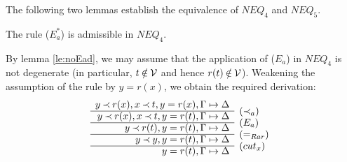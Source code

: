 The following two lemmas establish the equivalence of
  $NEQ_4$ and $NEQ_5$.

\begin{LEMMA}\label{le:Ea*}
The rule ($E_a^*$) is admissible in $NEQ_4$.
\end{LEMMA}
\begin{PROOF}
By lemma \ref{le:noEad}, we may assume that the application of ($E_a$) in
$NEQ_4$ is not degenerate (in particular, $t\not\in\Vars$ and hence $r(t)\not\in\Vars$).
Weakening the assumption of the rule by $y=r(x)$, we obtain the required
derivation:
\[ \begin{array}{rl}
 y\Incl r(x), x\Incl t, y=r(x), \GSD \\ \cline{1-1}
 y\Incl r(x), x\Incl t, y=r(t), \GSD & \rabove{(\Incl_a)} \\ \cline{1-1}
 y\Incl r(t), y=r(t), \GSD & \rabove{(E_a)} \\ \cline{1-1}
 y\Incl y, y=r(t), \GSD & \rabove{(=_{Rar})} \\ \cline{1-1}
  y=r(t), \GSD & \rabove{(cut_x)} \end{array} \]
\end{PROOF}

